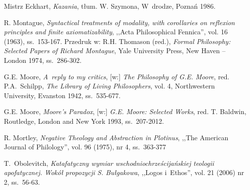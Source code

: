 \begin{thebibliography}{100}


Mistrz Eckhart, \textit{Kazania}, tłum. W. Szymona, W~drodze, Poznań 1986.

R. Montague, \textit{Syntactical treatments of modality, with corollaries on reflexion principles and finite axiomatizability}, ,,Acta Philosophical Fennica'', vol. 16 (1963), ss.~153-167.
Przedruk w: R.H. Thomason (red.), \textit{Formal Philosophy: Selected Papers of Richard Montague}, Yale University Press, New Haven -- London 1974, ss.~286-302.

G.E. Moore, \textit{A~reply to my critics}, [w:] \textit{The Philosophy of G.E. Moore}, red. P.A.~Schilpp,
\textit{The Library of Living Philosophers}, vol. 4, Northwestern University, Evanston 1942, ss.~535-677.

G.E. Moore, \textit{Moore's Paradox}, [w:] \textit{G.E. Moore: Selected Works}, red. T. Baldwin, Routledge, London and New York 1993, ss.~207-2012.

R. Mortley, \textit{Negative Theology and Abstraction in Plotinus}, ,,The American Journal of Philology'', vol. 96 (1975), nr 4, ss.~363-377



T.~Obolevitch, \textit{Katafatyczny wymiar wschodniochrześcijańskiej teologii apofatycznej. Wokół propozycji S. Bułgakowa}, ,,Logos i~Ethos'', vol. 21 (2006) nr 2, ss.~56-63.


\end{thebibliography}
